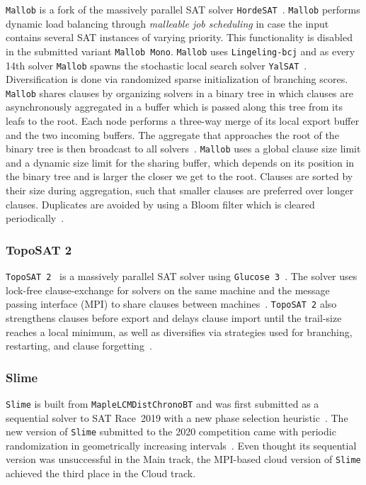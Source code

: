 \documentclass{elsarticle}
\newcommand{\solver}[1]{\texttt{#1}}
\begin{document}
\solver{Mallob} is a fork of the  massively parallel SAT solver \solver{HordeSAT}~\cite{Balyo:2015:HordeSATs}. 
\solver{Mallob} performs dynamic load balancing through \emph{malleable job scheduling} in case the input contains several SAT instances of varying priority. 
This functionality is disabled in the submitted variant \solver{Mallob Mono}. 
\solver{Mallob} uses \solver{Lingeling-bcj} and as every 14th solver \solver{Mallob} spawns the stochastic local search solver \solver{YalSAT}~\cite{Biere:2018:LingelingYalsat}.
Diversification is done via randomized sparse initialization of branching scores. 
\solver{Mallob} shares clauses by organizing solvers in a binary tree in which clauses are asynchronously aggregated in a buffer which is passed along this tree from its leafs to the root. 
Each node performs a three-way merge of its local export buffer and the two incoming buffers. 
The aggregate that approaches the root of the binary tree is then broadcast to all solvers~\cite{Schreiber:SC2020}. 
\solver{Mallob} uses a global clause size limit and a dynamic size limit for the sharing buffer, which depends on its position in the binary tree and is larger the closer we get to the root. 
Clauses are sorted by their size during aggregation, such that smaller clauses are preferred over longer clauses. 
Duplicates are avoided by using a Bloom filter which is cleared periodically~\cite{Schreiber:SC2020}. 


\subsubsection{TopoSAT 2}

\solver{TopoSAT~2}~\cite{Ehlers:2018:Toposat2} is a massively parallel SAT solver using \solver{Glucose~3}~\cite{Audemard:2018:Glucose}. 
The solver
 uses lock-free clause-exchange for solvers on the same machine and the message passing interface (MPI) to share clauses between machines~\cite{Hamadi:2009:ManySat}. 
\solver{TopoSAT~2} also strengthens clauses before export and delays clause import until the trail-size reaches a local minimum, as well as
diversifies via strategies used for branching, restarting, and clause forgetting~\cite{Ehlers:SC2020}. 


\subsubsection{Slime}

\solver{Slime} is built from \solver{MapleLCMDistChronoBT} and was first submitted as a sequential solver to SAT Race~2019 with a new phase selection heuristic~\cite{Riveros:SC2019}. 
The new version of \solver{Slime} submitted to the 2020 competition came with periodic randomization in geometrically increasing intervals~\cite{Riveros:SC2020}. 
Even thought its sequential version was unsuccessful in the Main track, the MPI-based cloud version of \solver{Slime} achieved the third place in the Cloud track. 
\end{document}
